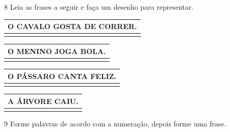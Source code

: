

\num{8} Leia as frases a seguir e faça um desenho para representar.


\begin{longtable}[]{@{}l@{}}
\toprule
O CAVALO GOSTA DE CORRER.\tabularnewline
\midrule
\endhead
\tabularnewline
\bottomrule
\end{longtable}

\begin{longtable}[]{@{}l@{}}
\toprule
O MENINO JOGA BOLA.\tabularnewline
\midrule
\endhead
\tabularnewline
\bottomrule
\end{longtable}

\begin{longtable}[]{@{}l@{}}
\toprule
O PÁSSARO CANTA FELIZ.\tabularnewline
\midrule
\endhead
\tabularnewline
\bottomrule
\end{longtable}

\begin{longtable}[]{@{}l@{}}
\toprule
A ÁRVORE CAIU.\tabularnewline
\midrule
\endhead
\tabularnewline
\bottomrule
\end{longtable}


\num{9} Forme palavras de acordo com a numeração, depois forme uma frase.


